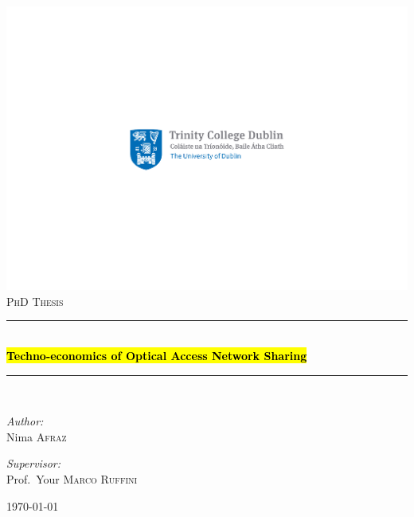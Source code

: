 \begin{titlepage}

\begin{center}



\includegraphics{img/bilingual_logo}\\[2.5cm]


\textsc{\Large PhD Thesis}\\[0.5cm]

\newcommand{\HRule}{\rule{\linewidth}{0.5mm}} %

\HRule \\[1cm]
{ \huge \bfseries \hl{Techno-economics of Optical Access Network Sharing}}\\[1cm]
\HRule \\[1.5cm]

\vspace{2cm}
\begin{minipage}{0.4\textwidth}
\begin{flushleft} \large
\emph{Author:}\\
Nima \textsc{Afraz}
\end{flushleft}
\end{minipage}
\begin{minipage}{0.4\textwidth}
\begin{flushright} \large
\emph{Supervisor:} \\
Prof.~Your \textsc{Marco Ruffini\\}
\end{flushright}
\end{minipage}

\vfill

{\large \today}

\end{center}

\end{titlepage}
